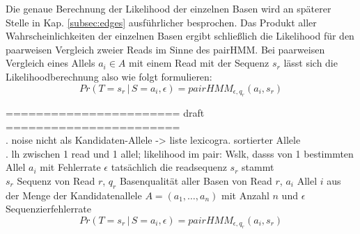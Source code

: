Die genaue Berechnung der Likelihood der einzelnen Basen wird an späterer Stelle in Kap. \ref{subsec:edges} ausführlicher besprochen. Das Produkt aller Wahrscheinlichkeiten der einzelnen Basen ergibt schließlich die Likelihood für den paarweisen Vergleich zweier Reads im Sinne des pairHMM. Bei paarweisen Vergleich eines Allels $a_{i} \in A $ mit einem Read mit der Sequenz $s_{r}$ lässt sich die Likelihoodberechnung also wie folgt formulieren:
\begin{equation} \label{eqn:2-15}
\tag{2-15}
Pr(T=s_{r} \, | \, S=a_{i}, \epsilon) = pairHMM_{\epsilon,q_{r}}(a_{i}, s_{r})
\end{equation}


\noindent======================= draft =======================\\

. noise nicht als Kandidaten-Allele -> liste lexicogra. sortierter Allele\\

. lh zwischen 1 read und 1 allel; likelihood im pair: Wslk, dasss von 1 bestimmten Allel $a_{i}$ mit Fehlerrate $\epsilon$ tatsächlich die readsequenz $s_{r}$ stammt \\
$s_{r}$ Sequenz von Read $r$, $q_{r}$ Basenqualität aller Basen von Read $r$, $a_{i}$ Allel $i$ aus der Menge der Kandidatenallele $A=(a_{1},\dots, a_{n})$ mit Anzahl $n$ und $\epsilon$ Sequenzierfehlerrate
\begin{equation} \label{eqn:2-16}
\tag{2-16}
Pr(T=s_{r} \, | \, S=a_{i}, \epsilon) = pairHMM_{\epsilon,q_{r}}(a_{i}, s_{r})
\end{equation}


